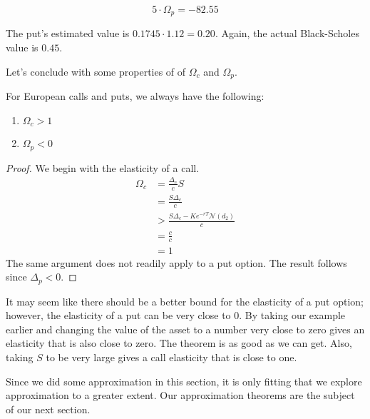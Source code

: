 \documentclass{ximera}
\begin{document}
\begin{equation*}
5\cdot \Omega_p 	=-82.55
\end{equation*}

The put's estimated value is $0.1745\cdot 1.12=0.20$. Again, the actual Black-Scholes value is $0.45$.

Let's conclude with some properties of of $\Omega_c$ and $\Omega_p$.

\begin{theorem}
For European calls and puts, we always have the following:
	\begin{enumerate}
	\item $\Omega_c>1$
	\item $\Omega_p<0$
	\end{enumerate}
\end{theorem}

\begin{proof}
We begin with the elasticity of a call.
	\begin{align*}
	\Omega_c 	&=\frac{\Delta_c}{c}S\\
			&=\frac{S\Delta_c}{c}\\
			&>\frac{S\Delta_c-Ke^{-rT}\mathcal{N}(d_2)}{c}\\
			&=\frac{c}{c}\\
			&=1
	\end{align*}
The same argument does not readily apply to a put option. The result follows since $\Delta_p<0$.
\end{proof}

It may seem like there should be a better bound for the elasticity of a put option; however, the elasticity of a put can be very close to 0. By taking our example earlier and changing the value of the asset to a number very close to zero gives an elasticity that is also close to zero. The theorem is as good as we can get. Also, taking $S$ to be very large gives a call elasticity that is close to one.

Since we did some approximation in this section, it is only fitting that we explore approximation to a greater extent. Our approximation theorems are the subject of our next section.
\end{document}
